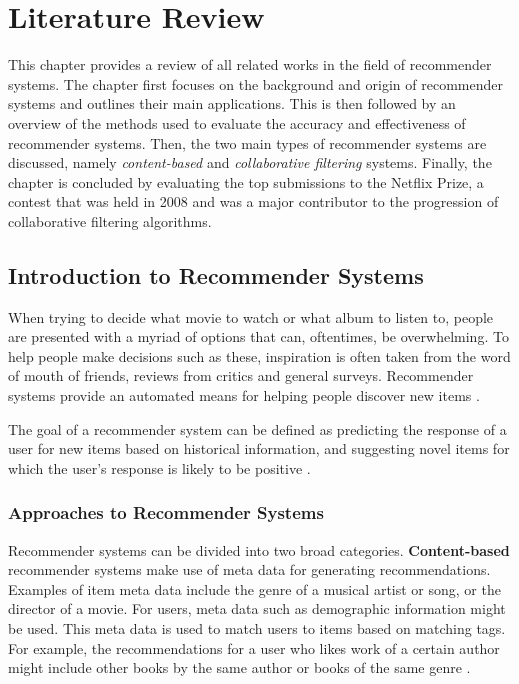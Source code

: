 \chapter{Literature Review}
\label{lit_review} %
This chapter provides a review of all related works in the field of recommender systems. The chapter first focuses on the background and origin of recommender systems and outlines their main applications. This is then followed by an overview of the methods used to evaluate the accuracy and effectiveness of recommender systems. Then, the two main types of recommender systems are discussed, namely \textit{content-based} and \textit{collaborative filtering} systems. Finally, the chapter is concluded by evaluating the top submissions to the Netflix Prize, a contest that was held in 2008 and was a major contributor to the progression of collaborative filtering algorithms.

\section{Introduction to Recommender Systems}
When trying to decide what movie to watch or what album to listen to, people are presented with a myriad of options that can, oftentimes, be overwhelming. To help people make decisions such as these, inspiration is often taken from the word of mouth of friends, reviews from critics and general surveys. Recommender systems provide an automated means for helping people discover new items \parencite{rs_1.1_Resnick}.

The goal of a recommender system can be defined as predicting the response of a user for new items based on historical information, and suggesting novel items for which the user's response is likely to be positive \parencite{handbook_1.4_neighbourhood}.

\subsection*{Approaches to Recommender Systems}
Recommender systems can be divided into two broad categories. \textbf{Content-based} recommender systems make use of meta data for generating recommendations. Examples of item meta data include the genre of a musical artist or song, or the director of a movie. For users, meta data such as demographic information might be used. This meta data is used to match users to items based on matching tags. For example, the recommendations for a user who likes work of a certain author might include other books by the same author or books of the same genre \parencite{di2012linked}.

